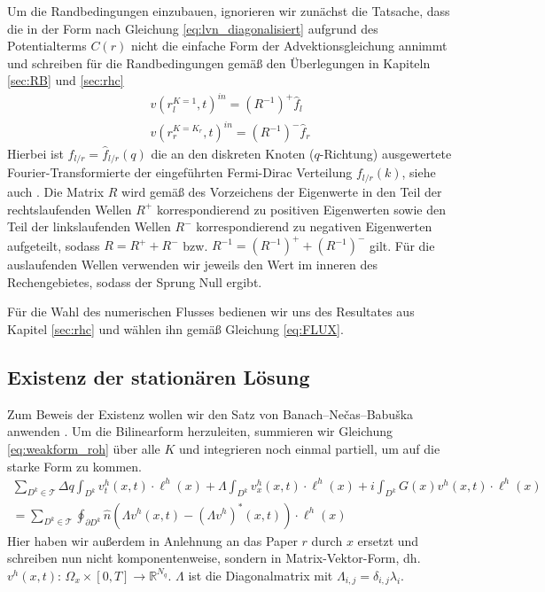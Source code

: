 Um die Randbedingungen einzubauen, ignorieren wir zunächst die Tatsache, dass die \lvn in der Form nach Gleichung \eqref{eq:lvn_diagonalisiert} aufgrund des Potentialterms $C(r)$ nicht die einfache Form der Advektionsgleichung annimmt und schreiben für die Randbedingungen gemäß den Überlegungen in Kapiteln \ref{sec:RB} und \ref{sec:rhc}
\begin{align}
  v(r_l^{K=1}, t)^{in} = (R^{-1})^+ \hat{f}_l  \\
  v(r_r^{K=K_r},t)^{in} = (R^{-1})^- \hat{f}_r
\end{align}
Hierbei ist $\hat{f}_{l/r} = \hat{f}_{l/r}(q)$ die an den diskreten  Knoten ($q$-Richtung) ausgewertete Fourier-Transformierte der eingeführten Fermi-Dirac Verteilung $f_{l/r}(k)$, siehe auch \cite{lukas1}. Die Matrix $R$ wird gemäß des Vorzeichens der Eigenwerte in den Teil der rechtslaufenden Wellen $R^+$ korrespondierend zu positiven Eigenwerten sowie den Teil der linkslaufenden Wellen $R^-$ korrespondierend zu negativen Eigenwerten aufgeteilt, sodass $R=R^+ + R^-$ bzw. $R^{-1} = (R^{-1})^+ + (R^{-1})^-$ gilt. Für die auslaufenden Wellen verwenden wir jeweils den Wert im inneren des Rechengebietes, sodass der Sprung Null ergibt. 

Für die Wahl des numerischen Flusses bedienen wir uns des Resultates aus Kapitel \ref{sec:rhc} und wählen ihn gemäß Gleichung \eqref{eq:FLUX}.

\subsection{Existenz der stationären Lösung}
Zum Beweis der Existenz wollen wir den Satz von Banach–Nečas–Babuška anwenden \cite{buch_ma}.  Um die Bilinearform herzuleiten, summieren wir Gleichung \eqref{eq:weakform_roh} über alle $K$ und integrieren noch einmal partiell, um auf die starke Form zu kommen.
\begin{align*}
  \sum_{D^k\in\mathcal{T}} \Delta q \int_{D^k} v^h_t(x,t)\cdot\ell^h(x) + \Lambda \int_{D^k} v^h_x(x,t) \cdot \ell^h(x) + i \int_{D^k} G(x) v^h(x,t) \cdot \ell^h(x)\\
      = \sum_{D^k\in\mathcal{T}}\oint_{\partial D^k}  \hat{n} (\Lambda v^h(x,t) -(\Lambda v^h)^*(x,t))\cdot \ell^h(x)
\end{align*}
Hier haben wir außerdem in Anlehnung an das Paper $r$ durch $x$ ersetzt und schreiben nun nicht komponentenweise, sondern in Matrix-Vektor-Form, dh. ${v^h(x,t):\,  \Omega_x \times [0,T] \rightarrow \mathbb{R}^{N_q}}$. $\Lambda$ ist die Diagonalmatrix mit $\Lambda_{i,j} = \delta_{i,j}\lambda_i$.

